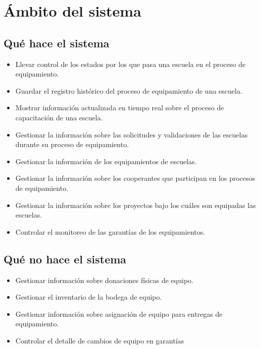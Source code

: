 \documentclass[11pt]{report}
\begin{document}
	\section{Ámbito del sistema}
	\subsection{Qué hace el sistema}
	\begin{itemize}
		\item Llevar control de los estados por los que pasa una escuela en el proceso de equipamiento.
		\item Guardar el registro histórico del proceso de equipamiento de una escuela.
		\item Mostrar información actualizada en tiempo real sobre el proceso de capacitación de una escuela.
		\item Gestionar la información sobre las solicitudes y validaciones de las escuelas durante su proceso de equipamiento.
		\item Gestionar la información de los equipamientos de escuelas.
		\item Gestionar la información sobre los cooperantes que participan en los procesos de equipamiento.
		\item Gestionar la información sobre los proyectos bajo los cuáles son equipadas las escuelas.
		\item Controlar el monitoreo de las garantías de los equipamientos.
	\end{itemize}
	\subsection{Qué no hace el sistema}
	\begin{itemize}
		\item Gestionar información sobre donaciones físicas de equipo.
		\item Gestionar el inventario de la bodega de equipo.
		\item Gestionar información sobre asignación de equipo para entregas de equipamiento.
		\item Controlar el detalle de cambios de equipo en garantías
	\end{itemize}
	
\end{document}

